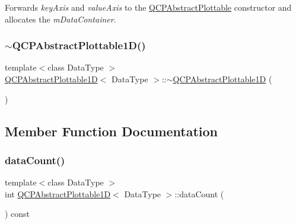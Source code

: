Forwards {\itshape key\+Axis} and {\itshape value\+Axis} to the \mbox{\hyperlink{class_q_c_p_abstract_plottable_af78a036e40db6f53a31abadc5323715a}{Q\+C\+P\+Abstract\+Plottable}} constructor and allocates the {\itshape m\+Data\+Container}. \mbox{\label{class_q_c_p_abstract_plottable1_d_afa6d5d2c971fed63bff4f4a79989a3f8}} 
\subsubsection{\texorpdfstring{$\sim$QCPAbstractPlottable1D()}{~QCPAbstractPlottable1D()}}
{\footnotesize\ttfamily template$<$class Data\+Type $>$ \\
\mbox{\hyperlink{class_q_c_p_abstract_plottable1_d}{Q\+C\+P\+Abstract\+Plottable1D}}$<$ Data\+Type $>$\+::$\sim$\mbox{\hyperlink{class_q_c_p_abstract_plottable1_d}{Q\+C\+P\+Abstract\+Plottable1D}} (\begin{DoxyParamCaption}{ }\end{DoxyParamCaption})\hspace{0.3cm}{\ttfamily [virtual]}}



\subsection{Member Function Documentation}
\mbox{\label{class_q_c_p_abstract_plottable1_d_ab5dd99e4f1621e7dbd63438e0b02984e}} 
\subsubsection{\texorpdfstring{dataCount()}{dataCount()}}
{\footnotesize\ttfamily template$<$class Data\+Type $>$ \\
int \mbox{\hyperlink{class_q_c_p_abstract_plottable1_d}{Q\+C\+P\+Abstract\+Plottable1D}}$<$ Data\+Type $>$\+::data\+Count (\begin{DoxyParamCaption}{ }\end{DoxyParamCaption}) const\hspace{0.3cm}{\ttfamily [virtual]}}





